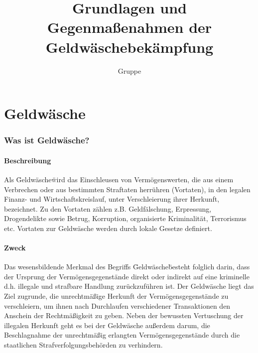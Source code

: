 \documentclass{article}
\begin{document}
\title{Grundlagen und Gegenmaßenahmen der Geldwäschebekämpfung}
\author{Gruppe}
\maketitle

\tableofcontents


\newpage

\part[Geldwäsche]{Geldwäsche}

    \section[Was ist Geldwäsche?]{Was ist Geldwäsche?}
            
        \subsection[Beschreibung]{Beschreibung}

            Als \"Geldwäsche\" wird das Einschleusen von Vermögenswerten, die aus einem Verbrechen oder aus bestimmten Straftaten herrühren (Vortaten), in den legalen Finanz- und Wirtschaftskreislauf, unter Verschleierung ihrer Herkunft, bezeichnet. Zu den Vortaten zählen z.B. Geldfälschung, Erpressung, Drogendelikte sowie Betrug, Korruption, organisierte Kriminalität, Terrorismus etc. Vortaten zur Geldwäsche werden durch lokale Gesetze definiert.
        
        \subsection[Zweck]{Zweck}

            Das wesensbildende Merkmal des Begriffs \"Geldwäsche\" besteht folglich darin, dass der Ursprung der Vermögensgegenstände direkt oder indirekt auf eine kriminelle d.h. illegale und strafbare Handlung zurückzuführen ist.
            Der Geldwäsche liegt das Ziel zugrunde, die unrechtmäßige Herkunft der Vermögensgegenstände zu verschleiern, um ihnen nach Durchlaufen verschiedener Transaktionen den Anschein der Rechtmäßigkeit zu geben. 
            Neben der bewussten Vertuschung der illegalen Herkunft geht es bei der Geldwäsche außerdem darum, die Beschlagnahme der unrechtmäßig erlangten Vermögensgegenstände durch die staatlichen Strafverfolgungsbehörden zu verhindern.
\end{document}
